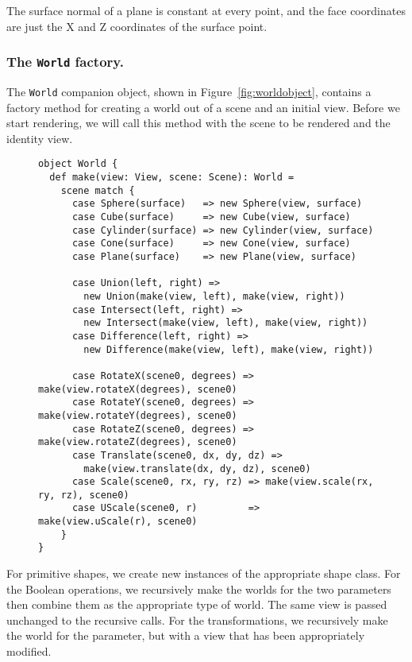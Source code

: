 The surface normal of a plane is constant at every point,
and the face coordinates are just the X and Z coordinates of the surface point.


\subsubsection{The \texttt{World} factory.\label{sec:worldfactory}}

The \verb!World! companion object,
shown in Figure~\ref{fig:worldobject},
contains a factory method for
creating a world out of a scene and an initial view.
Before we start rendering,
we will call this method with the scene to be rendered
and the identity view.

\begin{figure}
\begin{verbatim}
object World {
  def make(view: View, scene: Scene): World =
    scene match {
      case Sphere(surface)   => new Sphere(view, surface)
      case Cube(surface)     => new Cube(view, surface)
      case Cylinder(surface) => new Cylinder(view, surface)
      case Cone(surface)     => new Cone(view, surface)
      case Plane(surface)    => new Plane(view, surface)

      case Union(left, right) =>
        new Union(make(view, left), make(view, right))
      case Intersect(left, right) =>
        new Intersect(make(view, left), make(view, right))
      case Difference(left, right) =>
        new Difference(make(view, left), make(view, right))

      case RotateX(scene0, degrees) => make(view.rotateX(degrees), scene0)
      case RotateY(scene0, degrees) => make(view.rotateY(degrees), scene0)
      case RotateZ(scene0, degrees) => make(view.rotateZ(degrees), scene0)
      case Translate(scene0, dx, dy, dz) =>
        make(view.translate(dx, dy, dz), scene0)
      case Scale(scene0, rx, ry, rz) => make(view.scale(rx, ry, rz), scene0)
      case UScale(scene0, r)         => make(view.uScale(r), scene0)
    }
}
\end{verbatim}
\getcaption
\end{figure}

For primitive shapes,
we create new instances of the appropriate shape class.
For the Boolean operations,
we recursively make the worlds for the two parameters
then combine them as the appropriate type of world.
The same view is passed unchanged to the recursive calls.
For the transformations,
we recursively make the world for the parameter,
but with a view that has been appropriately modified.

